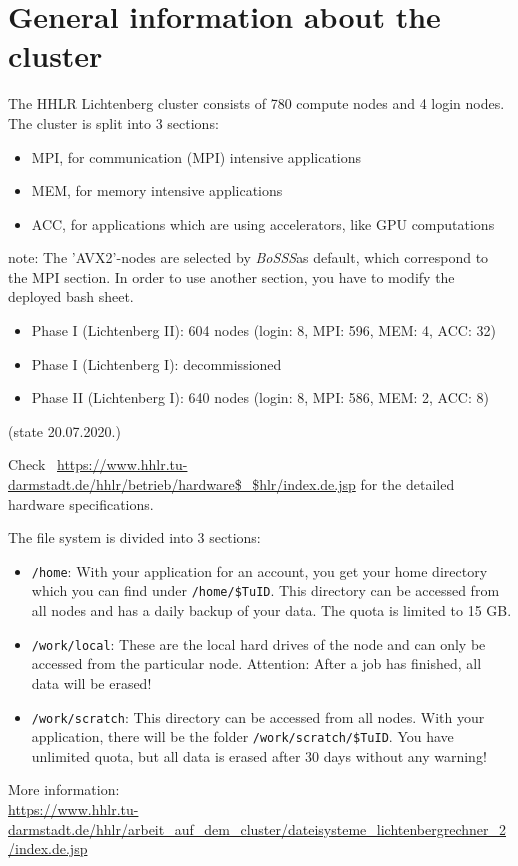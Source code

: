 \documentclass[11pt,twoside,a4paper]{fdyartcl}
\newcommand{\Bosss}{\textit{BoSSS}}
\begin{document}
\section{General information about the cluster}
\label{sec:information}

The HHLR Lichtenberg cluster consists of 780 compute nodes and 4 login nodes. The cluster is split into 3 sections: 
\begin{itemize}
	\item MPI, for communication (MPI) intensive applications
	\item MEM, for memory intensive applications
	\item ACC, for applications which are using accelerators, like GPU computations
\end{itemize}
note: The 'AVX2'-nodes are selected by \Bosss as default, which correspond to the MPI section. In order to use another section, you have to modify the deployed bash sheet.

\begin{itemize}
\item Phase I (Lichtenberg II): 604 nodes (login: 8, MPI: 596, MEM: 4, ACC: 32)
\item Phase I (Lichtenberg I): decommissioned
\item Phase II (Lichtenberg I): 640 nodes (login: 8, MPI: 586, MEM: 2, ACC: 8)
\end{itemize}
(state 20.07.2020.)

Check \ \url{https://www.hhlr.tu-darmstadt.de/hhlr/betrieb/hardware$\_$hlr/index.de.jsp} for the detailed hardware specifications.

The file system is divided into 3 sections:
\begin{itemize}
\item \verb|/home|: With your application for an account, you get your home directory which you can find under \verb|/home/$TuID|. This directory can be accessed from all nodes and has a daily backup of your data. The quota is limited to 15 GB. 
\item \verb|/work/local|: These are the local hard drives of the node and can only be accessed from the particular node. Attention: After a job has finished, all data will be erased! 
\item \verb|/work/scratch|:  This directory can be accessed from all nodes. With your application, there will be the folder \verb|/work/scratch/$TuID|. You have unlimited quota, but all data is erased after 30 days without any warning! 
\end{itemize}
More information: \\ \url{https://www.hhlr.tu-darmstadt.de/hhlr/arbeit_auf_dem_cluster/dateisysteme_lichtenbergrechner_2/index.de.jsp}
\end{document}
